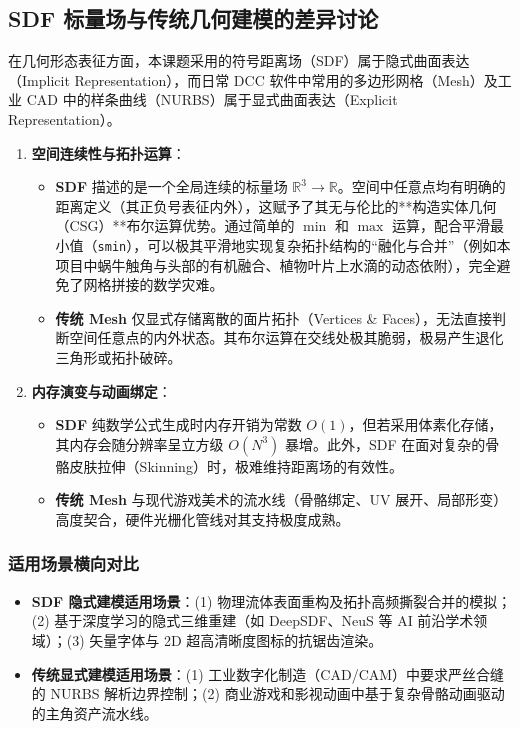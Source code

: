 \documentclass[11pt, a4paper, oneside]{report}
\begin{document}
\subsection{SDF 标量场与传统几何建模的差异讨论}
在几何形态表征方面，本课题采用的符号距离场（SDF）属于隐式曲面表达（Implicit Representation），而日常 DCC 软件中常用的多边形网格（Mesh）及工业 CAD 中的样条曲线（NURBS）属于显式曲面表达（Explicit Representation）。
\begin{enumerate}
    \item \textbf{空间连续性与拓扑运算}：
    \begin{itemize}
        \item \textbf{SDF} 描述的是一个全局连续的标量场 $\mathbb{R}^3 \to \mathbb{R}$。空间中任意点均有明确的距离定义（其正负号表征内外），这赋予了其无与伦比的**构造实体几何（CSG）**布尔运算优势。通过简单的 $\min$ 和 $\max$ 运算，配合平滑最小值（\texttt{smin}），可以极其平滑地实现复杂拓扑结构的“融化与合并”（例如本项目中蜗牛触角与头部的有机融合、植物叶片上水滴的动态依附），完全避免了网格拼接的数学灾难。
        \item \textbf{传统 Mesh} 仅显式存储离散的面片拓扑（Vertices \& Faces），无法直接判断空间任意点的内外状态。其布尔运算在交线处极其脆弱，极易产生退化三角形或拓扑破碎。
    \end{itemize}
    \item \textbf{内存演变与动画绑定}：
    \begin{itemize}
        \item \textbf{SDF} 纯数学公式生成时内存开销为常数 $O(1)$，但若采用体素化存储，其内存会随分辨率呈立方级 $O(N^3)$ 暴增。此外，SDF 在面对复杂的骨骼皮肤拉伸（Skinning）时，极难维持距离场的有效性。
        \item \textbf{传统 Mesh} 与现代游戏美术的流水线（骨骼绑定、UV 展开、局部形变）高度契合，硬件光栅化管线对其支持极度成熟。
    \end{itemize}
\end{enumerate}

\subsubsection{适用场景横向对比}
\begin{itemize}
    \item \textbf{SDF 隐式建模适用场景}：(1) 物理流体表面重构及拓扑高频撕裂合并的模拟；(2) 基于深度学习的隐式三维重建（如 DeepSDF、NeuS 等 AI 前沿学术领域）；(3) 矢量字体与 2D 超高清晰度图标的抗锯齿渲染。
    \item \textbf{传统显式建模适用场景}：(1) 工业数字化制造（CAD/CAM）中要求严丝合缝的 NURBS 解析边界控制；(2) 商业游戏和影视动画中基于复杂骨骼动画驱动的主角资产流水线。
\end{itemize}
\end{document}
